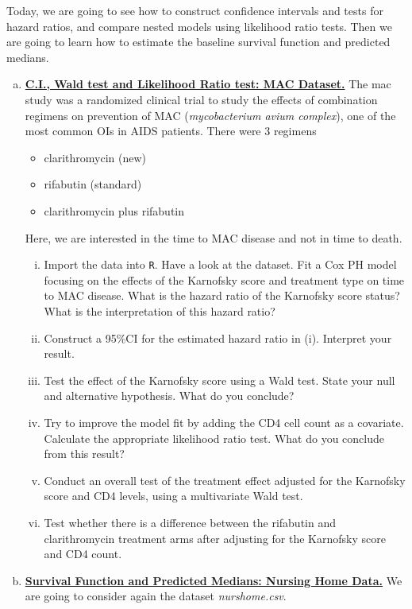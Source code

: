 Today, we are going to see how to construct confidence intervals and tests for hazard
ratios, and compare nested models using likelihood ratio tests. Then
we are going to learn how to estimate the baseline survival function and predicted
medians.
\begin{enumerate}[(a)]
 \item \textbf{\underline{C.I., Wald test and Likelihood Ratio test: MAC Dataset.}} The mac study was a randomized clinical trial to study the effects of
combination regimens on prevention of MAC (\emph{mycobacterium
avium complex}), one of the most common OIs in AIDS patients. There were 3 regimens
\begin{itemize}
\item clarithromycin (new)
\item rifabutin (standard)
\item clarithromycin plus rifabutin
\end{itemize}
Here, we are interested in the time to MAC disease and not in time to death.
\begin{enumerate}[(i)]
\item Import the data into \verb|R|. Have a look at the dataset. Fit a Cox PH model focusing on the effects of the Karnofsky score and treatment type on time to MAC disease. What is the hazard ratio of the Karnofsky score status? What is the interpretation 
of this hazard ratio?
\item Construct a 95\%CI for the estimated hazard ratio in (i). Interpret your result. 
\item Test the effect of the Karnofsky score using a Wald test. State your null and 
alternative hypothesis. What do you conclude?
\item Try to improve the model fit by adding the CD4 cell count as a covariate. Calculate the appropriate likelihood ratio test. What do you conclude from this result?
\item Conduct an overall test of the treatment effect
adjusted for the Karnofsky score and CD4 levels, using a multivariate Wald test.
\item Test whether there is a difference between the 
rifabutin and clarithromycin treatment arms after adjusting for the Karnofsky score and CD4 count.
\end{enumerate}
\newpage
\item \textbf{\underline{Survival Function and Predicted Medians: Nursing Home Data.}} We are going to consider again the dataset \emph{nurshome.csv}. 
\begin{enumerate}[(i)]

\end{enumerate}
\end{enumerate}
